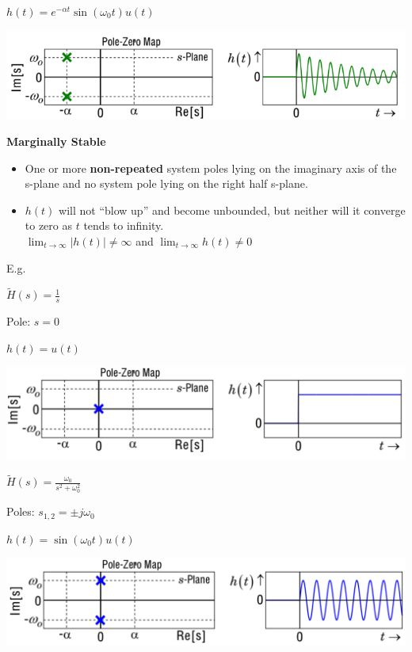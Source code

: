 \documentclass[landscape,a4paper]{extarticle}
\newenvironment{Figure}
  {\par\medskip\noindent\minipage{\linewidth}}
  {\endminipage\par\medskip}
\begin{document}
\begin{multicols*}{5}
    $h(t) = e^{-\alpha t} \sin (\omega_0 t) u (t)$

    \begin{Figure}
        \centering
        \includegraphics[width=\linewidth]{biboStable2.png}        
    \end{Figure}

    \textbf{Marginally Stable}
    \begin{itemize}
        \item One or more \textbf{non-repeated} system poles lying on the imaginary axis of the s-plane and no system pole lying on the right half s-plane.
        \item $h(t)$ will not ``blow up'' and become unbounded, but neither will it converge to zero as $t$ tends to infinity.\\
        $\lim_{t \to \infty} |h(t)| \neq \infty$ and $\lim_{t \to \infty} h(t) \neq 0$
    \end{itemize}

    E.g.

    $\tilde{H}(s) = \frac{1}{s}$

    Pole: $s = 0$

    $h(t) = u(t)$
    \begin{Figure}
        \centering
        \includegraphics[width=\linewidth]{marginallyStable1.png}        
    \end{Figure}

    $\tilde{H}(s) = \frac{\omega_0}{s^2 + \omega_0^2}$

    Poles: $s_{1,2} = \pm j\omega_0$

    $h(t) = \sin (\omega_0 t) u (t)$

    \begin{Figure}
        \centering
        \includegraphics[width=\linewidth]{marginallyStable2.png}        
    \end{Figure}


\end{multicols*}
\end{document}
